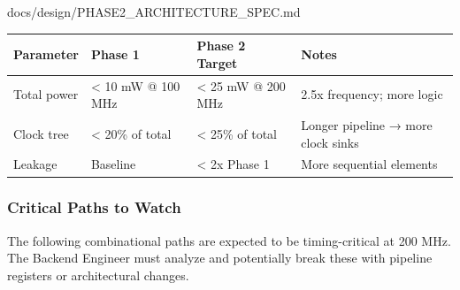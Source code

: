 \begin{relocated}{docs/design/PHASE2_ARCHITECTURE_SPEC.md}
{
\begin{longtable}[]{@{}
  >{\raggedright\arraybackslash}p{}
  >{\raggedright\arraybackslash}p{}
  >{\raggedright\arraybackslash}p{}
  >{\raggedright\arraybackslash}p{}@{}}
\toprule\noalign{}
\begin{minipage}[b]{\linewidth}\raggedright
Parameter
\end{minipage} & \begin{minipage}[b]{\linewidth}\raggedright
Phase 1
\end{minipage} & \begin{minipage}[b]{\linewidth}\raggedright
Phase 2 Target
\end{minipage} & \begin{minipage}[b]{\linewidth}\raggedright
Notes
\end{minipage} \\
\midrule\noalign{}
\endhead
\bottomrule\noalign{}
\endlastfoot
Total power & \textless{} 10 mW @ 100 MHz & \textless{} 25 mW @ 200 MHz
& 2.5x frequency; more logic \\
Clock tree & \textless{} 20\% of total & \textless{} 25\% of total &
Longer pipeline → more clock sinks \\
Leakage & Baseline & \textless{} 2x Phase 1 & More sequential
elements \\
\end{longtable}
}

\subsubsection{Critical Paths to Watch}\label{ds:ch:phase2-architecture:84-critical-paths-to-watch}

The following combinational paths are expected to be timing-critical at
200 MHz. The Backend Engineer must analyze and potentially break these
with pipeline registers or architectural changes.

{\small\setlength{\tabcolsep}{4pt}

}
\end{relocated}
